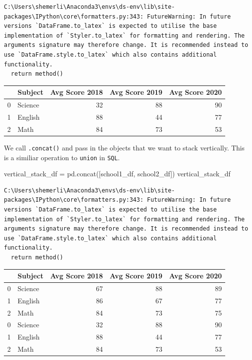 \documentclass[
  letterpaper,
  DIV=11,
  numbers=noendperiod]{scrreprt}
\newenvironment{Shaded}{\begin{snugshade}}{\end{snugshade}}
\newcommand{\NormalTok}[1]{\textcolor[rgb]{0.00,0.23,0.31}{#1}}
\newcommand{\OperatorTok}[1]{\textcolor[rgb]{0.37,0.37,0.37}{#1}}
\begin{document}
\begin{verbatim}
C:\Users\shemerli\Anaconda3\envs\ds-env\lib\site-packages\IPython\core\formatters.py:343: FutureWarning: In future versions `DataFrame.to_latex` is expected to utilise the base implementation of `Styler.to_latex` for formatting and rendering. The arguments signature may therefore change. It is recommended instead to use `DataFrame.style.to_latex` which also contains additional functionality.
  return method()
\end{verbatim}

\begin{tabular}{llrrr}
\toprule
{} &  Subject &  Avg Score 2018 &  Avg Score 2019 &  Avg Score 2020 \\
\midrule
0 &  Science &              32 &              88 &              90 \\
1 &  English &              88 &              44 &              77 \\
2 &     Math &              84 &              73 &              53 \\
\bottomrule
\end{tabular}

We call \texttt{.concat()} and pass in the objects that we want to stack
vertically. This is a similiar operation to \texttt{union} in
\texttt{SQL}.

\begin{Shaded}
\begin{Highlighting}[]
\NormalTok{vertical\_stack\_df }\OperatorTok{=}\NormalTok{ pd.concat([school1\_df, school2\_df])}
\NormalTok{vertical\_stack\_df}
\end{Highlighting}
\end{Shaded}

\begin{verbatim}
C:\Users\shemerli\Anaconda3\envs\ds-env\lib\site-packages\IPython\core\formatters.py:343: FutureWarning: In future versions `DataFrame.to_latex` is expected to utilise the base implementation of `Styler.to_latex` for formatting and rendering. The arguments signature may therefore change. It is recommended instead to use `DataFrame.style.to_latex` which also contains additional functionality.
  return method()
\end{verbatim}

\begin{tabular}{llrrr}
\toprule
{} &  Subject &  Avg Score 2018 &  Avg Score 2019 &  Avg Score 2020 \\
\midrule
0 &  Science &              67 &              88 &              89 \\
1 &  English &              86 &              67 &              77 \\
2 &     Math &              84 &              73 &              75 \\
0 &  Science &              32 &              88 &              90 \\
1 &  English &              88 &              44 &              77 \\
2 &     Math &              84 &              73 &              53 \\
\bottomrule
\end{tabular}
\end{document}

